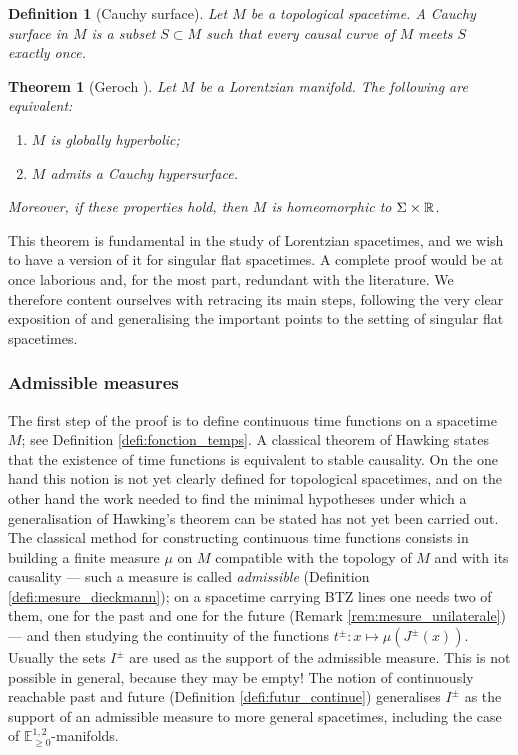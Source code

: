 \documentclass[a4paper,twoside]{article}
\newcommand{\mass}[1]{\mathbb{E}^{1,2}_{#1}}
\newtheorem{defi}[lem]{Definition}
\newtheorem{theo}{Theorem}
\begin{document}
\begin{defi}[Cauchy surface] Let $M$ be a topological spacetime. A Cauchy surface in $M$ is a subset
$S\subset M$ such that every causal curve of $M$ meets $S$ exactly once.
\end{defi}
\begin{theo}[Geroch \cite{MR0270697}] Let $M$ be a Lorentzian manifold. The following are equivalent:
\begin{enumerate}[label=(\roman*)]
\item $M$ is globally hyperbolic;
\item $M$ admits a Cauchy hypersurface.
\end{enumerate}
Moreover, if these properties hold, then $M$ is homeomorphic to $\Sigma\times \mathbb R$.
\end{theo}
This theorem is fundamental in the study of Lorentzian spacetimes,
and we wish to have a version of it for singular flat spacetimes. A complete proof would be at once laborious and, for the most part,
redundant with the literature.
We therefore content ourselves with retracing its main steps, following the very clear exposition of \cite{MR2196783} and generalising the important points to the setting of singular flat spacetimes.

\subsubsection{Admissible measures}
The first step of the proof is to define continuous time functions on a spacetime
$M$; see Definition \ref{defi:fonction_temps}.
A classical theorem of Hawking states that the existence of time functions is equivalent to stable causality.
On the one hand this notion is not yet clearly defined for topological spacetimes, and on the other hand the work needed
to find the minimal hypotheses under which a generalisation of Hawking's theorem can be stated has not yet been carried out.
The classical method \cite{MR0270697,MR0334862,MR962333,MR2196783} for constructing continuous time functions
consists in building a finite measure $\mu$ on $M$ compatible with the
topology of $M$ and with its causality --- such a measure is called {\it admissible} (Definition \ref{defi:mesure_dieckmann}); on a spacetime carrying BTZ lines one needs two of them, one for the past and one for the future (Remark \ref{rem:mesure_unilaterale}) ---
and then studying the continuity of the functions $t^\pm : x\mapsto \mu(J^\pm(x))$.
Usually the sets $I^\pm$ are used as the support of the admissible measure. This is not possible in general, because they may be empty!
The notion of continuously reachable past and future (Definition \ref{defi:futur_continue}) generalises $I^\pm$ as the support of an admissible measure
to more general spacetimes, including the case of $\mass{\geq0}$-manifolds.
\end{document}
